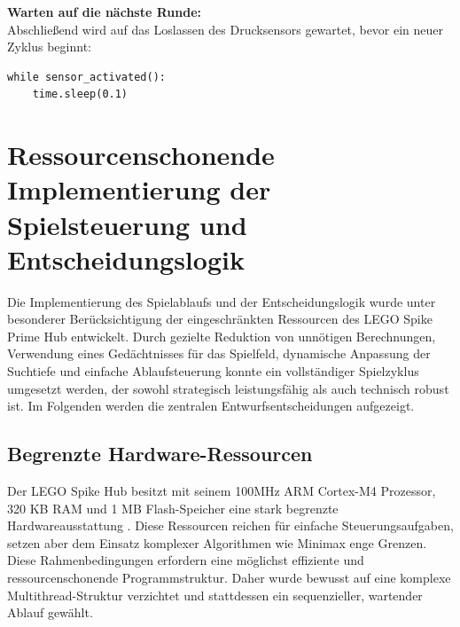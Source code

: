 \textbf{Warten auf die nächste Runde:}\\
Abschließend wird auf das Loslassen des Drucksensors gewartet, bevor ein neuer Zyklus beginnt:

\begin{lstlisting}[style=pythonstyle]
	while sensor_activated():
	time.sleep(0.1)
\end{lstlisting}



\section{Ressourcenschonende Implementierung der Spielsteuerung und Entscheidungslogik}

Die Implementierung des Spielablaufs und der Entscheidungslogik wurde unter besonderer Berücksichtigung der eingeschränkten Ressourcen des LEGO Spike Prime Hub entwickelt. Durch gezielte Reduktion von unnötigen Berechnungen, Verwendung eines Gedächtnisses für das Spielfeld, dynamische Anpassung der Suchtiefe und einfache Ablaufsteuerung konnte ein vollständiger Spielzyklus umgesetzt werden, der sowohl strategisch leistungsfähig als auch technisch robust ist. Im Folgenden werden die zentralen Entwurfsentscheidungen aufgezeigt.

\subsection{Begrenzte Hardware-Ressourcen}
Der LEGO Spike Hub besitzt mit seinem 100MHz ARM Cortex-M4 Prozessor, 320 KB RAM und 1 MB Flash-Speicher eine stark begrenzte Hardwareausstattung \cite{lego2020techniclargehub}. Diese Ressourcen reichen für einfache Steuerungsaufgaben, setzen aber dem Einsatz komplexer Algorithmen wie Minimax enge Grenzen.
Diese Rahmenbedingungen erfordern eine möglichst effiziente und ressourcenschonende Programmstruktur. Daher wurde bewusst auf eine komplexe Multithread-Struktur verzichtet und stattdessen ein sequenzieller, wartender Ablauf gewählt.

